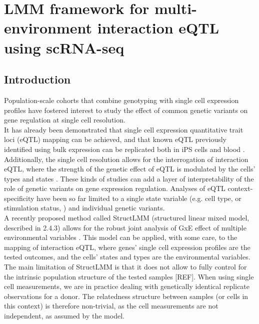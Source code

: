 
\chapter{LMM framework for multi-environment interaction eQTL using scRNA-seq}


\section{Introduction} 

Population-scale cohorts that combine genotyping with single cell expression profiles have fostered interest to study the effect of common genetic variants on gene regulation at single cell resolution.\\

It has already been demonstrated that single cell expression quantitative trait loci (eQTL) mapping can be achieved, and that known eQTL previously identified using bulk expression can be replicated both in iPS cells and blood \cite{cuomo2020single,van2018single}.
Additionally, the single cell resolution allows for the interrogation of interaction eQTL, where the strength of the genetic effect of eQTL is modulated by the cells’ types and states \cite{cuomo2020single}. 
These kinds of studies can add a layer of interpretability of the role of genetic variants on gene expression regulation. 
Analyses of eQTL context-specificity have been so far limited to a single state variable (e.g. cell type, \cite{fairfax2012genetics} or stimulation status,\cite{fairfax2014innate} ) and individual genetic variants.\\

A recently proposed method called StructLMM (structured linear mixed model, described in 2.4.3) allows for the robust joint analysis of GxE effect of multiple environmental variables \cite{moore2019linear}.
This model can be applied, with some care, to the mapping of interaction eQTL, where genes’ single cell expression profiles are the tested outcomes, and the cells’ states and types are the environmental variables. 
The main limitation of StructLMM is that it does not allow to fully control for the intrinsic population structure of the tested samples [REF]. 
When using single cell measurements, we are in practice dealing with genetically identical replicate observations for a donor. 
The relatedness structure between samples (or cells in this context) is therefore non-trivial, as the cell measurements are not independent, as assumed by the model.\\

